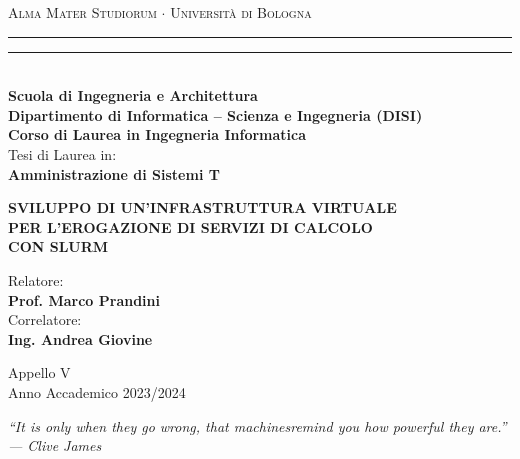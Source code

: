 \documentclass[12pt,a4paper,twoside,openright]{book}
\begin{document}
\begin{titlepage}
\begin{center}
{{\Large{\textsc{Alma Mater Studiorum $\cdot$ Universit\`a di Bologna}}}}
\rule[0.1cm]{\linewidth}{0.1mm}
\rule[0.5cm]{\linewidth}{0.6mm}\\
\vspace{3mm}
{\small{\bf Scuola di Ingegneria e Architettura\\ 
Dipartimento di Informatica -- Scienza e Ingegneria (DISI)\\
Corso di Laurea in Ingegneria Informatica}}\\
\vspace{10mm}
Tesi di Laurea in:\\
\textbf{Amministrazione di Sistemi T}
\end{center}
\vspace{21mm}
\begin{center}
{\large \bf SVILUPPO DI UN'INFRASTRUTTURA VIRTUALE\\[1mm] PER L'EROGAZIONE DI SERVIZI DI CALCOLO\\[1mm] CON SLURM\par}
\end{center}
\vspace{32mm}
\begin{minipage}[t]{0.45\textwidth}{
\large{
Relatore:
\vspace{2mm}\\{
\bf Prof. Marco Prandini
}
\vspace{6mm}\\{
Correlatore:
\vspace{2mm}\\
\bf Ing. Andrea Giovine
}
}}
\end{minipage}
\hfill
\begin{minipage}[t]{0.45\textwidth}
\end{minipage}
\vspace{32mm}
\begin{center}
Appello V\\
\vspace{1mm}
Anno Accademico 2023/2024
\end{center}
\end{titlepage}
\restoregeometry

\cleardoublepage
\begin{flushright}
\thispagestyle{empty}
\null{}
\textit{
    ``It is only when they go wrong, that machines\break remind you how powerful they are.''\\
    \vspace{1.5mm} --- Clive James}
\null
\end{flushright}
\end{document}
